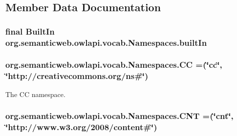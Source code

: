 \subsection{Member Data Documentation}
\hypertarget{enumorg_1_1semanticweb_1_1owlapi_1_1vocab_1_1_namespaces_a7da60dac2579b84cd14c7846aefe0f44}{
\subsubsection[{built\-In}]{\setlength{\rightskip}{0pt plus 5cm}final Built\-In org.\-semanticweb.\-owlapi.\-vocab.\-Namespaces.\-built\-In}}\label{enumorg_1_1semanticweb_1_1owlapi_1_1vocab_1_1_namespaces_a7da60dac2579b84cd14c7846aefe0f44}
\hypertarget{enumorg_1_1semanticweb_1_1owlapi_1_1vocab_1_1_namespaces_aa30cd90eec232dc4e73bcfebc8a00427}{
\subsubsection[{C\-C}]{\setlength{\rightskip}{0pt plus 5cm}org.\-semanticweb.\-owlapi.\-vocab.\-Namespaces.\-C\-C =(\char`\"{}cc\char`\"{}, \char`\"{}http\-://creativecommons.\-org/{\bf ns}\#\char`\"{})}}\label{enumorg_1_1semanticweb_1_1owlapi_1_1vocab_1_1_namespaces_aa30cd90eec232dc4e73bcfebc8a00427}
The C\-C namespace. \hypertarget{enumorg_1_1semanticweb_1_1owlapi_1_1vocab_1_1_namespaces_a35facdb7a8b9f61c2c675fa46943a9be}{
\subsubsection[{C\-N\-T}]{\setlength{\rightskip}{0pt plus 5cm}org.\-semanticweb.\-owlapi.\-vocab.\-Namespaces.\-C\-N\-T =(\char`\"{}cnt\char`\"{}, \char`\"{}http\-://www.\-w3.\-org/2008/content\#\char`\"{})}}\label{enumorg_1_1semanticweb_1_1owlapi_1_1vocab_1_1_namespaces_a35facdb7a8b9f61c2c675fa46943a9be}
